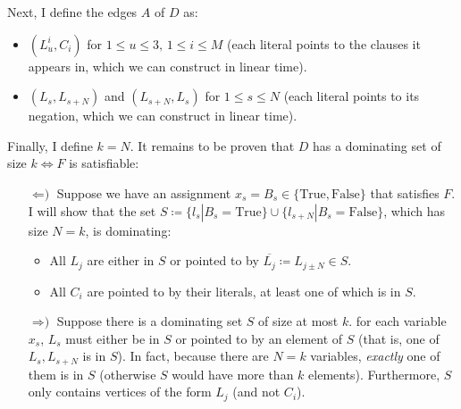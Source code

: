 \documentclass{amsart}
\theoremstyle{plain}
\theoremstyle{definition}
\begin{document}
\begin{enumerate}[label=\textbf{Exercise \arabic*:}, leftmargin=0cm, labelwidth=-0.2cm, align=left]
\begin{itemize}
            \end{itemize}

            Next, I define the edges $A$ of $D$ as:
            \begin{itemize}
                \item $\left( L^i_u, C_i \right)$ for $1 \leq u \leq 3,\, 1 \leq i \leq M$
                (each literal points to the clauses it appears in, which we can construct in linear time).

                \item $\left( L_s, L_{s+N} \right)$ and $\left( L_{s+N}, L_{s} \right)$ for $1 \leq s \leq N$
                (each literal points to its negation, which we can construct in linear time).

            \end{itemize}

            Finally, I define $k = N$.
            It remains to be proven that $D$ has a dominating set of size $k \iff F$ is satisfiable:


            \begin{itemize}

                \item[$\Leftarrow\text{)}$] Suppose we have an assignment $x_s = B_s \in \{\text{True}, \text{False}\}$
                that satisfies $F$.
                I will show that the set $S \coloneqq \{l_s | B_s = \text{True}\} \cup \{l_{s+N} | B_s = \text{False}\}$,
                which has size $N=k$, is dominating:
                \begin{itemize}
                    \item All $L_j$ are either in $S$ or pointed to by $ \overline{L_j} \coloneqq L_{j \pm N} \in S$.
                    \item All $C_i$ are pointed to by their literals, at least one of which is in $S$.
                \end{itemize}

                \item[$\Rightarrow\text{)}$] Suppose there is a dominating set $S$ of size at most $k$.
                for each variable $x_s$, $L_s$ must either be in $S$ or pointed to by an element of $S$
                (that is, one of $L_s, L_{s+N}$ is in $S$). In fact, because there are $N=k$ variables,
                \emph{exactly} one of them is in $S$ (otherwise $S$ would have more than $k$ elements).
                Furthermore, $S$ only contains vertices of the form $L_j$ (and not $C_i$).


\end{itemize}
\end{enumerate}
\end{document}
